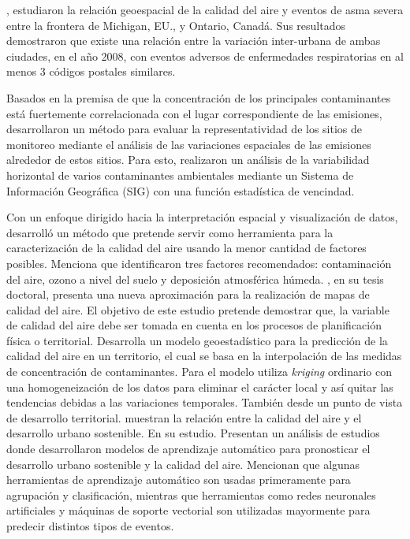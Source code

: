 \citet{Lemke2014}, estudiaron la relación geoespacial de la calidad del aire y eventos de asma severa entre la frontera de Michigan, EU., y Ontario, Canadá. Sus resultados demostraron que existe una relación entre la variación inter-urbana de ambas ciudades, en el año 2008, con eventos adversos de enfermedades respiratorias en al menos 3 códigos postales similares.

Basados en la premisa de que la concentración de los principales contaminantes está fuertemente correlacionada con el lugar correspondiente de las emisiones, \citet{Righini2014} desarrollaron un método para evaluar la representatividad de los sitios de monitoreo mediante el análisis de las variaciones espaciales de las emisiones alrededor de estos sitios. Para esto, realizaron un análisis de la variabilidad horizontal de varios contaminantes ambientales mediante un Sistema de Información Geográfica (SIG) con una función estadística de vencindad.

Con un enfoque dirigido hacia la interpretación espacial y visualización de datos, \citet{Hunova2001} desarrolló un método que pretende servir como herramienta para la caracterización de la calidad del aire usando la menor cantidad de factores posibles. Menciona que identificaron tres factores recomendados: contaminación del aire, ozono a nivel del suelo y deposición atmosférica húmeda. \citet{Aguilo2012}, en su tesis doctoral, presenta una nueva aproximación para la realización de mapas de calidad del aire. El objetivo de este estudio pretende demostrar que, la variable de calidad del aire debe ser tomada en cuenta en los procesos de planificación física o territorial. Desarrolla un modelo geoestadístico para la predicción de la calidad del aire en un territorio, el cual se basa en la interpolación de las medidas de concentración de contaminantes. Para el modelo utiliza \textit{kriging} ordinario con una homogeneización de los datos para eliminar el carácter local y así quitar las tendencias debidas a las variaciones temporales. También desde un punto de vista de desarrollo territorial. \citet{Molina2021} muestran la relación entre la calidad del aire y el desarrollo urbano sostenible. En su estudio. Presentan un análisis de estudios donde desarrollaron modelos de aprendizaje automático para pronosticar el desarrollo urbano sostenible y la calidad del aire. Mencionan que algunas herramientas de aprendizaje automático son usadas primeramente para agrupación y clasificación, mientras que herramientas como redes neuronales artificiales y máquinas de soporte vectorial son utilizadas mayormente para predecir distintos tipos de eventos.


